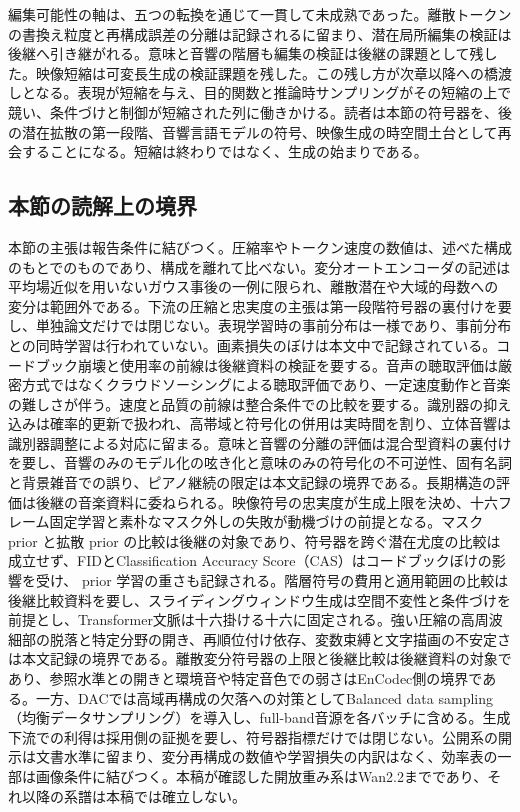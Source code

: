 \documentclass[lualatex,a4paper,10pt]{jlreq}
\begin{document}
編集可能性の軸は、五つの転換を通じて一貫して未成熟であった。離散トークンの書換え粒度と再構成誤差の分離は記録されるに留まり、潜在局所編集の検証は後継へ引き継がれる\autocite{btd005}。意味と音響の階層も編集の検証は後継の課題として残した\autocite{btd009}。映像短縮は可変長生成の検証課題を残した\autocite{btd010}。この残し方が次章以降への橋渡しとなる。表現が短縮を与え、目的関数と推論時サンプリングがその短縮の上で競い、条件づけと制御が短縮された列に働きかける。読者は本節の符号器を、後の潜在拡散の第一段階\autocite{btd004}、音響言語モデルの符号\autocite{btd006}、映像生成の時空間土台\autocite{btd012}として再会することになる。短縮は終わりではなく、生成の始まりである。

\subsection{本節の読解上の境界}
本節の主張は報告条件に結びつく。圧縮率やトークン速度の数値は、述べた構成のもとでのものであり、構成を離れて比べない\autocite{btd006,btd008}。変分オートエンコーダの記述は平均場近似を用いないガウス事後の一例に限られ、離散潜在や大域的母数への変分は範囲外である\autocite{btd001}。下流の圧縮と忠実度の主張は第一段階符号器の裏付けを要し、単独論文だけでは閉じない\autocite{btd004}。表現学習時の事前分布は一様であり、事前分布との同時学習は行われていない。画素損失のぼけは本文中で記録されている\autocite{btd002}。コードブック崩壊と使用率の前線は後継資料の検証を要する。音声の聴取評価は厳密方式ではなくクラウドソーシングによる聴取評価であり、一定速度動作と音楽の難しさが伴う\autocite{btd006}。速度と品質の前線は整合条件での比較を要する\autocite{btd007}。識別器の抑え込みは確率的更新で扱われ、高帯域と符号化の併用は実時間を割り、立体音響は識別器調整による対応に留まる\autocite{btd008}。意味と音響の分離の評価は混合型資料の裏付けを要し\autocite{btd009}、音響のみのモデル化の呟き化と意味のみの符号化の不可逆性、固有名詞と背景雑音での誤り、ピアノ継続の限定は本文記録の境界である\autocite{btd009}。長期構造の評価は後継の音楽資料に委ねられる。映像符号の忠実度が生成上限を決め、十六フレーム固定学習と素朴なマスク外しの失敗が動機づけの前提となる\autocite{btd010}。マスク prior と拡散 prior の比較は後継の対象であり、符号器を跨ぐ潜在尤度の比較は成立せず、FIDとClassification Accuracy Score（CAS）はコードブックぼけの影響を受け、 prior 学習の重さも記録される\autocite{btd003}。階層符号の費用と適用範囲の比較は後継比較資料を要し、スライディングウィンドウ生成は空間不変性と条件づけを前提とし、Transformer文脈は十六掛ける十六に固定される\autocite{btd004}。強い圧縮の高周波細部の脱落と特定分野の開き、再順位付け依存、変数束縛と文字描画の不安定さは本文記録の境界である\autocite{btd005}。離散変分符号器の上限と後継比較は後継資料の対象であり、参照水準との開きと環境音や特定音色での弱さはEnCodec側の境界である\autocite{btd007}。一方、DACでは高域再構成の欠落への対策としてBalanced data sampling（均衡データサンプリング）を導入し、full-band音源を各バッチに含める\autocite{btd008}。生成下流での利得は採用側の証拠を要し、符号器指標だけでは閉じない。公開系の開示は文書水準に留まり、変分再構成の数値や学習損失の内訳はなく、効率表の一部は画像条件に結びつく\autocite{btd012}。本稿が確認した開放重み系はWan2.2までであり、それ以降の系譜は本稿では確立しない\autocite{btd124}。
\end{document}
